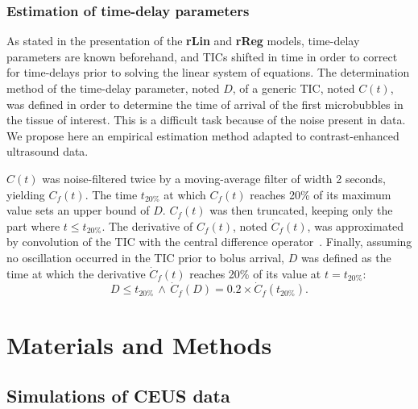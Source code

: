 \subsubsection{Estimation of time-delay parameters}\label{sec:estimationDelay}
As stated in the presentation of the \textbf{rLin} and \textbf{rReg} models, time-delay parameters are known beforehand, and TICs shifted in time in order to correct for time-delays prior to solving the linear system of equations.
The determination method of the time-delay parameter, noted $D$, of a generic TIC, noted $C\left(t\right)$, was defined in order to determine the time of arrival of the first microbubbles in the tissue of interest.
This is a difficult task because of the noise present in data. 
We propose here an empirical estimation method adapted to contrast-enhanced ultrasound data.

$C\left(t\right)$ was noise-filtered twice by a moving-average filter of width 2 seconds, yielding $C_f\left(t\right)$.
The time $t_{20\%}$ at which $C_f\left(t\right)$ reaches 20\% of its maximum value sets an upper bound of $D$.
$C_f\left(t\right)$ was then truncated, keeping only the part where $t \leq t_{20\%}$.
The derivative of $C_{f}\left(t\right)$, noted $\dot{C}_{f}\left(t\right)$, was approximated by convolution of the TIC with the central difference operator~\cite{Whittaker:2008wv}. %
Finally, assuming no oscillation occurred in the TIC prior to bolus arrival, $D$ was defined as the time at which the derivative $\dot{C}_{f}\left(t\right)$ reaches 20\% of its value at $t = t_{20\%}$:
\begin{equation}
D \leq t_{20\%}\,\wedge\,\dot{C}_{f}\left(D\right) = 0.2 \times \dot{C}_{f}\left(t_{20\%}\right).
\end{equation}

\section{Materials and Methods}
\subsection{Simulations of CEUS data}
